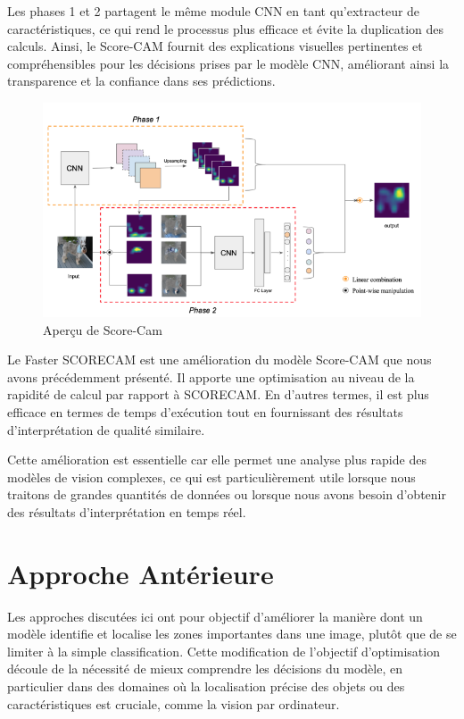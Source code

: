 \documentclass{report}
\begin{document}
{\hspace{1.6cm}Les phases 1 et 2 partagent le même module CNN en tant qu'extracteur de caractéristiques, ce qui rend le processus plus efficace et évite la duplication des calculs. Ainsi, le Score-CAM fournit des explications visuelles pertinentes et compréhensibles pour les décisions prises par le modèle CNN, améliorant ainsi la transparence et la confiance dans ses prédictions.

\begin{figure}[htbp] 
	\centering
        \includegraphics[width=16 cm]{logo/Scorecam.png} 
	\caption{Aperçu de Score-Cam\cite{Wang_2020_CVPR_Workshops}}
	\label{fig:Aperçu de Score-Cam}
\end{figure}
\vspace*{0.5\baselineskip}
\newpage

\hspace{1.6cm}
Le Faster SCORECAM\cite{Wang_2020_CVPR_Workshops} est une amélioration du modèle Score-CAM que nous avons précédemment présenté. Il apporte une optimisation au niveau de la rapidité de calcul par rapport à SCORECAM. En d'autres termes, il est plus efficace en termes de temps d'exécution tout en fournissant des résultats d'interprétation de qualité similaire.
\vspace*{0.1\baselineskip}

\hspace{1.6cm}Cette amélioration est essentielle car elle permet une analyse plus rapide des modèles de vision complexes, ce qui est particulièrement utile lorsque nous traitons de grandes quantités de données ou lorsque nous avons besoin d'obtenir des résultats d'interprétation en temps réel.

\section{Approche Antérieure}
\hspace{1.6cm}Les approches discutées ici ont pour objectif d'améliorer la manière dont un modèle identifie et localise les zones importantes dans une image, plutôt que de se limiter à la simple classification. Cette modification de l'objectif d'optimisation découle de la nécessité de mieux comprendre les décisions du modèle, en particulier dans des domaines où la localisation précise des objets ou des caractéristiques est cruciale, comme la vision par ordinateur.

}
\end{document}
